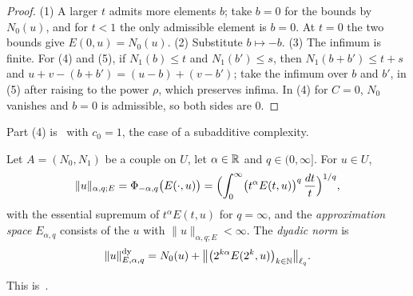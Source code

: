 \begin{proof}
\leanok
(1) A larger $t$ admits more elements $b$; take $b = 0$ for the bounds by $N_0(u)$, and for
$t < 1$ the only admissible element is $b = 0$. At $t = 0$ the two bounds give
$E(0, u) = N_0(u)$. (2) Substitute $b \mapsto -b$. (3) The infimum is finite. For (4) and (5),
if $N_1(b) \leq t$ and $N_1(b') \leq s$, then
$N_1(b + b') \leq t + s$ and $u + v - (b + b') = (u - b) + (v - b')$; take the infimum over $b$
and $b'$, in (5) after raising to the power $\rho$, which preserves infima. In (4) for $C = 0$,
$N_0$ vanishes and $b = 0$ is admissible, so both sides are $0$.
\end{proof}

Part (4) is~\cite[Lemma~7.1.1]{BerghLofstrom} with $c_0 = 1$, the case of a subadditive
complexity.

\begin{definition}
\label{def:e-method}
\leanok
{}
Let $A = (N_0, N_1)$ be a couple on $U$, let $\alpha \in \mathbb{R}$ and $q \in (0, \infty]$. For
$u \in U$,
\[
  \|u\|_{\alpha, q; E} = \Phi_{-\alpha, q}\bigl(E(\cdot, u)\bigr)
  = \Bigl(\int_0^\infty \bigl(t^{\alpha} E(t, u)\bigr)^q \, \frac{dt}{t}\Bigr)^{1/q} ,
\]
with the essential supremum of $t^\alpha E(t, u)$ for $q = \infty$, and the \emph{approximation
space} $E_{\alpha, q}$ consists of the $u$ with
$\|u\|_{\alpha, q; E} < \infty$. The \emph{dyadic norm} is
\[
  \|u\|^{\mathrm{dy}}_{E, \alpha, q} = N_0(u) + \bigl\| \bigl(2^{k\alpha} E(2^k, u)\bigr)_{k \in \mathbb{N}}
  \bigr\|_{\ell_q} .
\]
\end{definition}

This is~\cite[Definition~7.1.5]{BerghLofstrom}.

